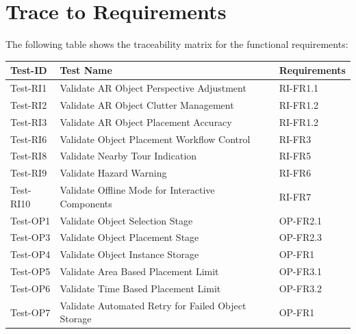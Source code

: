 \documentclass[12pt, titlepage]{article}
\begin{document}
\section{Trace to Requirements}

The following table shows the traceability matrix for the functional requirements:

\begin{table}[htpb!]
  \centering
  \begin{tabular}{|l|p{8cm}|p{3cm}|}
    \hline
    \textbf{Test-ID} & \textbf{Test Name}                                 & \textbf{Requirements} \\
    \hline
    Test-RI1         & Validate AR Object Perspective Adjustment          & RI-FR1.1              \\
    \hline
    Test-RI2         & Validate AR Object Clutter Management              & RI-FR1.2              \\
    \hline
    Test-RI3         & Validate AR Object Placement Accuracy              & RI-FR1.2              \\
    \hline
    Test-RI6         & Validate Object Placement Workflow Control         & RI-FR3                \\
    \hline
    Test-RI8         & Validate Nearby Tour Indication                    & RI-FR5                \\
    \hline
    Test-RI9         & Validate Hazard Warning                            & RI-FR6                \\
    \hline
    Test-RI10        & Validate Offline Mode for Interactive Components   & RI-FR7                \\
    \hline
    Test-OP1         & Validate Object Selection Stage                    & OP-FR2.1              \\
    \hline
    Test-OP3         & Validate Object Placement Stage                    & OP-FR2.3              \\
    \hline
    Test-OP4         & Validate Object Instance Storage                   & OP-FR1                \\
    \hline
    Test-OP5         & Validate Area Based Placement Limit                & OP-FR3.1              \\
    \hline
    Test-OP6         & Validate Time Based Placement Limit                & OP-FR3.2              \\
    \hline
    Test-OP7         & Validate Automated Retry for Failed Object Storage & OP-FR1                \\

\end{tabular}
\end{table}
\end{document}
